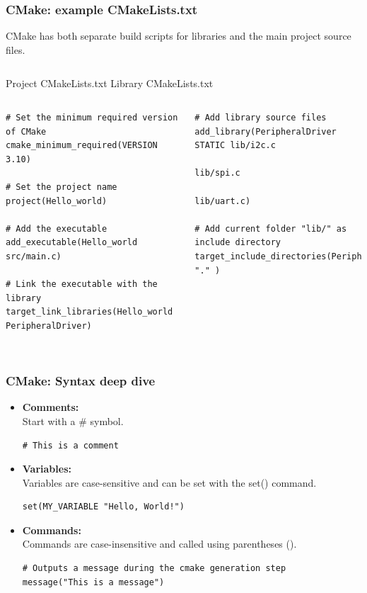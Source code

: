 \documentclass{beamer}
\begin{document}
\begin{frame}[fragile]
\frametitle{CMake: example CMakeLists.txt}
CMake has both separate build scripts for libraries and the main project source files. \\
\begin{columns}
    Project CMakeLists.txt
    Library CMakeLists.txt
\end{columns}
\tiny
\begin{columns}
    
   \begin{verbatim}
# Set the minimum required version of CMake
cmake_minimum_required(VERSION 3.10)

# Set the project name
project(Hello_world)

# Add the executable
add_executable(Hello_world src/main.c)

# Link the executable with the library
target_link_libraries(Hello_world PeripheralDriver)
        
    \end{verbatim}
    
   
   \begin{verbatim}
# Add library source files
add_library(PeripheralDriver STATIC lib/i2c.c 
                                    lib/spi.c 
                                    lib/uart.c)
                                            
# Add current folder "lib/" as include directory
target_include_directories(PeripheralDriver "." )
 \end{verbatim}
\end{columns}
\end{frame}

\begin{frame}[fragile]
\frametitle{CMake: Syntax deep dive}
\begin{itemize}
    \item \textbf{Comments:} \\
        Start with a \# symbol. \\
        \begin{verbatim}
# This is a comment
        \end{verbatim}
    \item \textbf{Variables:} \\
         Variables are case-sensitive and can be set with the set() command. \\
         \begin{verbatim} 
set(MY_VARIABLE "Hello, World!")
         \end{verbatim}
    \item \textbf{Commands:} \\
        Commands are case-insensitive and called using parentheses ().\\
        \begin{verbatim}
# Outputs a message during the cmake generation step
message("This is a message") 
        \end{verbatim}
\end{itemize}
\end{frame}
\end{document}
